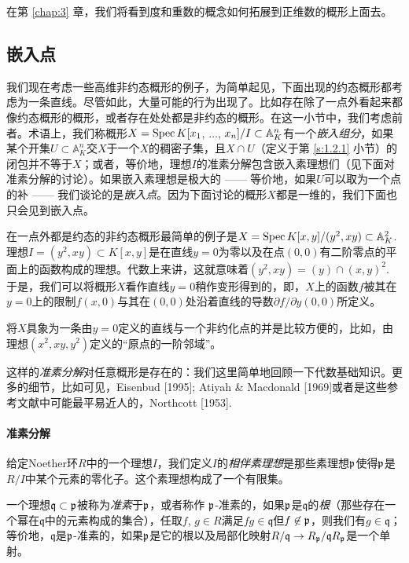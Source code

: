 在第 \ref{chap:3} 章，我们将看到度和重数的概念如何拓展到正维数的概形上面去。

\subsection{嵌入点}

我们现在考虑一些高维非约态概形的例子，为简单起见，下面出现的约态概形都考虑为一条直线。尽管如此，大量可能的行为出现了。比如存在除了一点外看起来都像约态概形的概形，或者存在处处都是非约态的概形。在这一小节中，我们考虑前者。术语上，我们称概形$X=\operatorname{Spec} K[x_1$, $\dots$, $x_n]/I\subset \mathbb{A}_{K}^n$有一个\textit{嵌入组分}，如果某个开集$U\subset \mathbb{A}^n_K$交$X$于一个$X$的稠密子集，且$X\cap U$（定义于第 \ref{s:1.2.1} 小节）的闭包并不等于$X$；或者，等价地，理想$I$的准素分解包含嵌入素理想们（见下面对准素分解的讨论）。如果嵌入素理想是极大的 ------ 等价地，如果$U$可以取为一个点的补 ------ 我们谈论的是\textit{嵌入点}。因为下面讨论的概形$X$都是一维的，我们下面也只会见到嵌入点。

在一点外都是约态的非约态概形最简单的例子是$X=\operatorname{Spec} K[x,y]/(y^2,xy)\subset \mathbb{A}_K^2$. 理想$I=(y^2,xy)\subset K[x,y]$是在直线$y=0$为零以及在点$(0,0)$有二阶零点的平面上的函数构成的理想。代数上来讲，这就意味着$(y^2,xy)=(y)\cap (x,y)^2$. 于是，我们可以将概形$X$看作直线$y=0$稍作变形得到的，即，$X$上的函数$f$被其在$y=0$上的限制$f(x,0)$与其在$(0,0)$处沿着直线的导数$\partial f/\partial y(0,0)$所定义。

将$X$具象为一条由$y=0$定义的直线与一个非约化点的并是比较方便的，比如，由理想$(x^2,xy,y^2)$定义的“原点的一阶邻域”。


这样的\textit{准素分解}对任意概形是存在的：我们这里简单地回顾一下代数基础知识。更多的细节，比如可见，Eisenbud [1995]; Atiyah \& Macdonald [1969]或者是这些参考文献中可能最平易近人的，Northcott [1953].

\paragraph*{准素分解} 
给定Noether环$R$中的一个理想$I$，我们定义$I$的\textit{相伴素理想}是那些素理想$\mathfrak{p}$使得$\mathfrak{p}$是$R/I$中某个元素的零化子。这个素理想构成了一个有限集。

一个理想$\mathfrak{q}\subset \mathfrak{p}$被称为\textit{准素}于$\mathfrak{p}$，或者称作
$\mathfrak{p}$-准素的，如果$\mathfrak{p}$是$\mathfrak{q}$的\textit{根}（那些存在一个幂在$\mathfrak{q}$中的元素构成的集合），任取$f$, $g\in R$满足$fg\in \mathfrak{q}$但$f\not\in \mathfrak{p}$，则我们有$g\in\mathfrak{q}$；等价地，$\mathfrak{q}$是$\mathfrak{p}$-准素的，如果$\mathfrak{p}$是它的根以及局部化映射$R/\mathfrak{q}\to R_{\mathfrak{p}}/\mathfrak{q}R_{\mathfrak{p}}$是一个单射。

